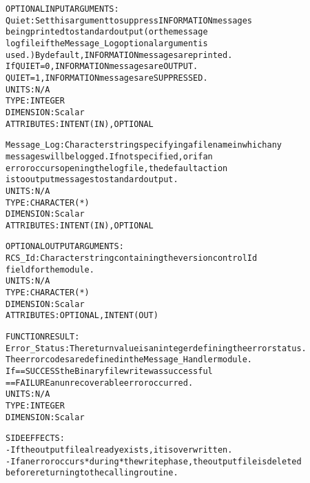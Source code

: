 \begin{alltt}
  OPTIONAL INPUT ARGUMENTS:
        Quiet:        Set this argument to suppress INFORMATION messages
                      being printed to standard output (or the message
                      log file if the Message_Log optional argument is
                      used.) By default, INFORMATION messages are printed.
                      If QUIET = 0, INFORMATION messages are OUTPUT.
                         QUIET = 1, INFORMATION messages are SUPPRESSED.
                      UNITS:      N/A
                      TYPE:       INTEGER
                      DIMENSION:  Scalar
                      ATTRIBUTES: INTENT(IN), OPTIONAL
 
        Message_Log:  Character string specifying a filename in which any
                      messages will be logged. If not specified, or if an
                      error occurs opening the log file, the default action
                      is to output messages to standard output.
                      UNITS:      N/A
                      TYPE:       CHARACTER(*)
                      DIMENSION:  Scalar
                      ATTRIBUTES: INTENT(IN), OPTIONAL
 
  OPTIONAL OUTPUT ARGUMENTS:
        RCS_Id:       Character string containing the version control Id
                      field for the module.
                      UNITS:      N/A
                      TYPE:       CHARACTER(*)
                      DIMENSION:  Scalar
                      ATTRIBUTES: OPTIONAL, INTENT(OUT)
 
  FUNCTION RESULT:
        Error_Status: The return value is an integer defining the error status.
                      The error codes are defined in the Message_Handler module.
                      If == SUCCESS the Binary file write was successful
                         == FAILURE an unrecoverable error occurred.
                      UNITS:      N/A
                      TYPE:       INTEGER
                      DIMENSION:  Scalar
 
  SIDE EFFECTS:
        - If the output file already exists, it is overwritten.
        - If an error occurs *during* the write phase, the output file is deleted
          before returning to the calling routine.
 
  \end{alltt}
